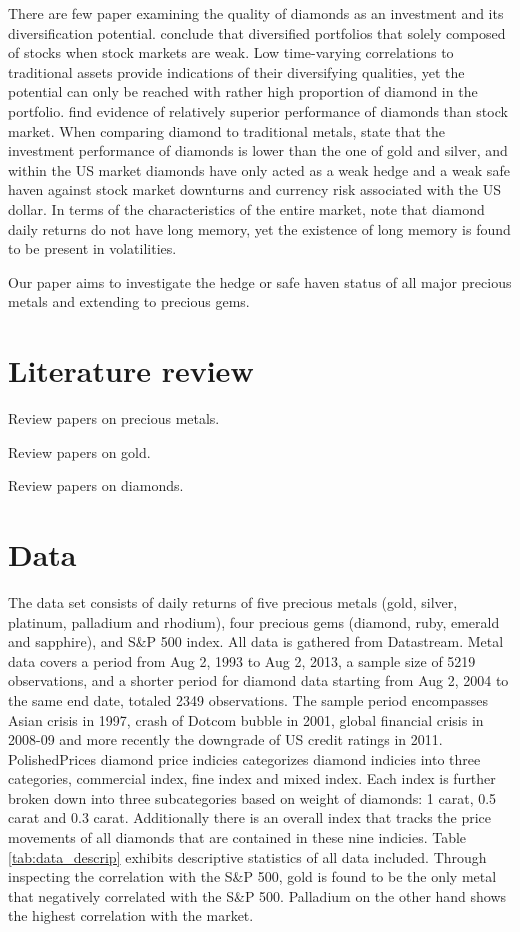 \documentclass[preprint,authoryear,11pt]{elsarticle}
\begin{document}
There are few paper examining the quality of diamonds as an investment and its diversification potential. \citet{auer_diamonds_2013} conclude that diversified portfolios that solely composed of stocks when stock markets are weak. Low time-varying correlations to traditional assets provide indications of their diversifying qualities, yet the potential can only be reached with rather high proportion of diamond in the portfolio. \citet{renneboog_hard_2012} find evidence of relatively superior performance of diamonds than stock market. When comparing diamond to traditional metals, \citet{auer_could_2014} state that the investment performance of diamonds is lower than the one of gold and silver, and within the US market diamonds have only acted as a weak hedge and a weak safe haven against stock market downturns and currency risk associated with the US dollar. In terms of the characteristics of the entire market, \citet{chong_long-range_2012} note that diamond daily returns do not have long memory, yet the existence of long memory is found to be present in volatilities. 

Our paper aims to investigate the hedge or safe haven status of all major precious metals and extending to precious gems.


\section{Literature review}
\label{sec:litreview}

Review papers on precious metals.

Review papers on gold.

Review papers on diamonds.


\section{Data}
\label{sec:data}

The data set consists of daily returns of five precious metals (gold, silver, platinum, palladium and rhodium), four precious gems (diamond, ruby, emerald and sapphire), and S\&P 500 index. All data is gathered from Datastream. Metal data covers a period from Aug 2, 1993 to Aug 2, 2013, a sample size of 5219 observations, and a shorter period for diamond data starting from Aug 2, 2004 to the same end date, totaled 2349 observations. The sample period encompasses Asian crisis in 1997, crash of Dotcom bubble in 2001, global financial crisis in 2008-09 and more recently the downgrade of US credit ratings in 2011. PolishedPrices diamond price indicies categorizes diamond indicies into three categories, commercial index, fine index and mixed index. Each index is further broken down into three subcategories based on weight of diamonds: 1 carat, 0.5 carat and 0.3 carat. Additionally there is an overall index that tracks the price movements of all diamonds that are contained in these nine indicies. Table \ref{tab:data_descrip}  exhibits descriptive statistics of all data included. Through inspecting the correlation with the S\&P 500, gold is found to be the only metal that negatively correlated with the S\&P 500. Palladium on the other hand shows the highest correlation with the market. 
\end{document}
